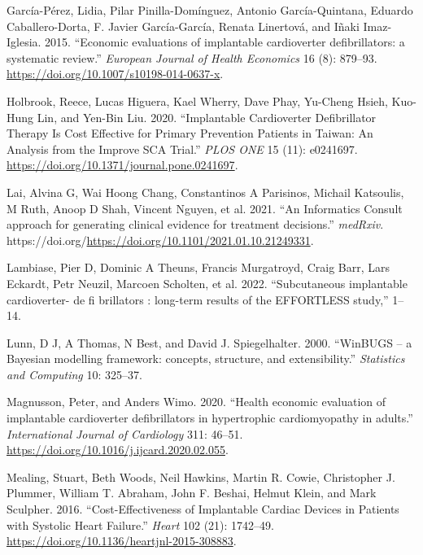 \documentclass[
]{article}
\newlength{\cslhangindent}
\newlength{\cslentryspacingunit} %
\newenvironment{CSLReferences}[2] %
 {%
  \setlength{\parindent}{0pt}
  \ifodd #1
  \let\oldpar\par
  \def\par{\hangindent=\cslhangindent\oldpar}
  \fi
  \setlength{\parskip}{#2\cslentryspacingunit}
 }%
 {}
\begin{document}
\begin{CSLReferences}{1}{0}
\leavevmode{}%
García-Pérez, Lidia, Pilar Pinilla-Domínguez, Antonio García-Quintana,
Eduardo Caballero-Dorta, F. Javier García-García, Renata Linertová, and
Iñaki Imaz-Iglesia. 2015. {``{Economic evaluations of implantable
cardioverter defibrillators: a systematic review}.''} \emph{European
Journal of Health Economics} 16 (8): 879--93.
\url{https://doi.org/10.1007/s10198-014-0637-x}.

\leavevmode{}%
Holbrook, Reece, Lucas Higuera, Kael Wherry, Dave Phay, Yu-Cheng Hsieh,
Kuo-Hung Lin, and Yen-Bin Liu. 2020. {``Implantable Cardioverter
Defibrillator Therapy Is Cost Effective for Primary Prevention Patients
in Taiwan: An Analysis from the Improve SCA Trial.''} \emph{PLOS ONE} 15
(11): e0241697. \url{https://doi.org/10.1371/journal.pone.0241697}.

\leavevmode{}%
Lai, Alvina G, Wai Hoong Chang, Constantinos A Parisinos, Michail
Katsoulis, M Ruth, Anoop D Shah, Vincent Nguyen, et al. 2021. {``{An
Informatics Consult approach for generating clinical evidence for
treatment decisions}.''} \emph{medRxiv}.
https://doi.org/\url{https://doi.org/10.1101/2021.01.10.21249331}.

\leavevmode{}%
Lambiase, Pier D, Dominic A Theuns, Francis Murgatroyd, Craig Barr, Lars
Eckardt, Petr Neuzil, Marcoen Scholten, et al. 2022. {``{Subcutaneous
implantable cardioverter- de fi brillators : long-term results of the
EFFORTLESS study},''} 1--14.

\leavevmode{}%
Lunn, D J, A Thomas, N Best, and David J. Spiegelhalter. 2000.
{``{WinBUGS -- a Bayesian modelling framework: concepts, structure, and
extensibility}.''} \emph{Statistics and Computing} 10: 325--37.

\leavevmode{}%
Magnusson, Peter, and Anders Wimo. 2020. {``{Health economic evaluation
of implantable cardioverter defibrillators in hypertrophic
cardiomyopathy in adults}.''} \emph{International Journal of Cardiology}
311: 46--51. \url{https://doi.org/10.1016/j.ijcard.2020.02.055}.

\leavevmode{}%
Mealing, Stuart, Beth Woods, Neil Hawkins, Martin R. Cowie, Christopher
J. Plummer, William T. Abraham, John F. Beshai, Helmut Klein, and Mark
Sculpher. 2016. {``Cost-Effectiveness of Implantable Cardiac Devices in
Patients with Systolic Heart Failure.''} \emph{Heart} 102 (21):
1742--49. \url{https://doi.org/10.1136/heartjnl-2015-308883}.


\end{CSLReferences}
\end{document}
